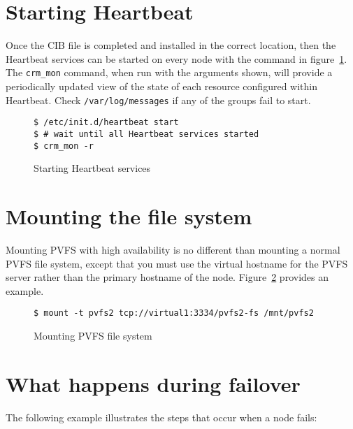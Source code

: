 \documentclass[11pt]{article}
\begin{document}
\section{Starting Heartbeat}

Once the CIB file is completed and installed in the correct location,
then the Heartbeat services can be started on every node with the
command in figure~\ref{fig:start}.  The \texttt{crm\_mon} command, when
run with the arguments shown, will provide a periodically updated view
of the state of each resource configured within Heartbeat.  Check
\texttt{/var/log/messages} if any of the groups fail to start.

\begin{figure}
\begin{scriptsize}
\begin{verbatim}
$ /etc/init.d/heartbeat start
$ # wait until all Heartbeat services started
$ crm_mon -r
\end{verbatim}
\end{scriptsize}
\caption{Starting Heartbeat services}
\label{fig:start}
\end{figure}

\section{Mounting the file system}

Mounting PVFS with high availability is no different than mounting a
normal PVFS file system, except that you must use the virtual hostname
for the PVFS server rather than the primary hostname of the node.
Figure~\ref{fig:mount} provides an example.

\begin{figure}
\begin{scriptsize}
\begin{verbatim}
$ mount -t pvfs2 tcp://virtual1:3334/pvfs2-fs /mnt/pvfs2
\end{verbatim}
\end{scriptsize}
\caption{Mounting PVFS file system}
\label{fig:mount}
\end{figure}

\section{What happens during failover}

The following example illustrates the steps that occur when a node fails:
\end{document}
